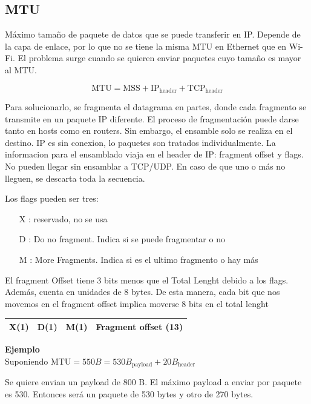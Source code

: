 \subsection{MTU}

Máximo tamaño de paquete de datos que se puede transferir en IP. Depende de la capa de enlace, por lo que no se tiene la misma MTU en Ethernet que en Wi-Fi. El problema surge cuando se quieren enviar paquetes cuyo tamaño es mayor al MTU.

$$ \mathrm{MTU} = \mathrm{MSS} + \mathrm{IP}_{\mathrm{header}} + \mathrm{TCP}_{\mathrm{header}} $$

Para solucionarlo, se fragmenta el datagrama en partes, donde cada fragmento se transmite en un paquete IP diferente. El proceso de fragmentación puede darse tanto en hosts como en routers. Sin embargo, el ensamble solo se realiza en el destino. IP es sin conexion, lo paquetes son tratados individualmente. La informacion para el ensamblado viaja en el header de IP: fragment offset y flags. No pueden llegar sin ensamblar a TCP/UDP. En caso de que uno o más no lleguen, se descarta toda la secuencia.

Los flags pueden ser tres:

\begin{itemize}
    \item [X]: reservado, no se usa
    \item [D]: Do no fragment. Indica si se puede fragmentar o no
    \item [M]: More Fragments. Indica si es el ultimo fragmento o hay más
\end{itemize}

El fragment Offset tiene 3 bits menos que el Total Lenght debido a los flags. Además, cuenta en unidades de 8 bytes. De esta manera, cada bit que nos movemos en el fragment offset implica moverse 8 bits en el total lenght

\begin{center}
    \begin{tabular}{c|c|c|c}
    \hline
         X(1) & D(1) & M(1) & Fragment offset (13)  \\
    \hline     
    \end{tabular}
\end{center}

\textbf{Ejemplo} \\

Suponiendo $ \mathrm{MTU} = 550 B = 530 B_{\mathrm{payload}} + 20 B_{\mathrm{header}} $

Se quiere envian un payload de 800 B. El máximo payload a enviar por paquete es 530. Entonces será un paquete de 530 bytes y otro de 270 bytes.

